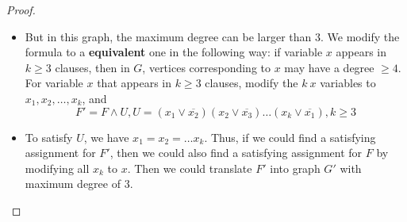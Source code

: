 \documentclass{article}
\newcommand{\<}{
    \langle}
\renewcommand{\>}{
    \rangle}
\begin{document}
{\begin{proof}
\begin{itemize}
        \item But in this graph, the maximum degree can be larger than $3$. We modify the formula to a \textbf{equivalent} one in the following way: if variable $x$ appears in $k\geq 3$ clauses, then in $G$, vertices corresponding to $x$ may have a degree $\geq 4$. For variable $x$ that appears in $k\geq 3$ clauses, modify the $k\ x$ variables to $x_1,x_2,\ldots,x_k$, and
        \begin{displaymath}
            F'=F\wedge U,U=(x_1\vee \overline{x_2})(x_2\vee \overline{x_3})\ldots(x_k\vee \overline{x_1}),k\geq 3
        \end{displaymath}
        \item To satisfy $U$, we have $x_1=x_2=\ldots x_k$. Thus, if we could find a satisfying assignment for $F'$, then we could also find a satisfying assignment for $F$ by modifying all $x_k$ to $x$. Then we could translate $F'$ into graph $G'$ with maximum degree of $3$. 
    \end{itemize}
\end{proof}
\newpage

}
\end{document}
